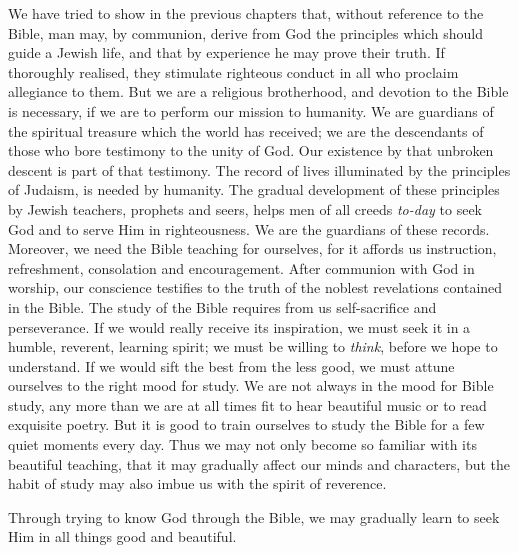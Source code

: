We have tried to show in the previous
chapters that, without reference to the Bible,
man may, by communion, derive from God
the principles which should guide a Jewish
life, and that by experience he may prove
their truth. If thoroughly realised, they
stimulate righteous conduct in all who proclaim
allegiance to them. But we are a
religious brotherhood, and devotion to the
Bible is necessary, if we are to perform our
mission to humanity. We are guardians of
the spiritual treasure which the world has
received; we are the descendants of those
who bore testimony to the unity of God. Our
existence by that unbroken descent is part
of that testimony. The record of lives
illuminated by the principles of Judaism, is
needed by humanity. The gradual development
of these principles by Jewish
teachers, prophets and seers, helps men
of all creeds \textsl{to-day} to seek God and
to serve Him in righteousness. We are
the guardians of these records. Moreover,
we need the Bible teaching for ourselves,
for it affords us instruction, refreshment,
consolation and encouragement. After communion
with God in worship, our conscience
testifies to the truth of the noblest revelations
contained in the Bible. The study of the
Bible requires from us self-sacrifice and
perseverance. If we would really receive
its inspiration, we must seek it in a humble,
reverent, learning spirit; we must be willing
to \textsl{think}, before we hope to understand. If
we would sift the best from the less good, we
must attune ourselves to the right mood for
study. We are not always in the mood for
Bible study, any more than we are at all times
fit to hear beautiful music or to read exquisite
poetry. But it is good to train
ourselves to study the Bible for a few quiet
moments every day. Thus we may not
only become so familiar with its beautiful
teaching, that it may gradually affect our
minds and characters, but the habit of study
may also imbue us with the spirit of reverence.

Through trying to know God through the
Bible, we may gradually learn to seek Him
in all things good and beautiful.


